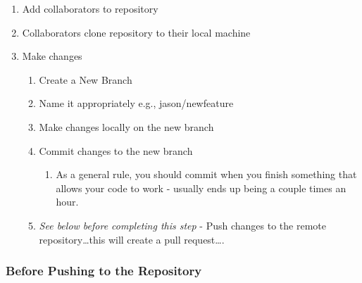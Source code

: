 \documentclass[
  letterpaper,
  DIV=11,
  numbers=noendperiod]{scrreprt}
\providecommand{\tightlist}{%
  \setlength{\itemsep}{0pt}\setlength{\parskip}{0pt}}\usepackage{longtable,booktabs,array}
\begin{document}
\begin{enumerate}
\def\labelenumi{\arabic{enumi}.}
\tightlist
\item
  Add collaborators to repository\\
\item
  Collaborators clone repository to their local machine\\
\item
  Make changes

  \begin{enumerate}
  \def\labelenumii{\alph{enumii}.}
  \tightlist
  \item
    Create a New Branch\\
  \item
    Name it appropriately e.g., jason/newfeature\\
  \item
    Make changes locally on the new branch\\
  \item
    Commit changes to the new branch

    \begin{enumerate}
    \def\labelenumiii{\roman{enumiii}.}
    \tightlist
    \item
      As a general rule, you should commit when you finish something
      that allows your code to work - usually ends up being a couple
      times an hour.\\
    \end{enumerate}
  \item
    \emph{See below before completing this step} - Push changes to the
    remote repository\ldots this will create a pull request\ldots.
  \end{enumerate}
\end{enumerate}

\subsubsection{Before Pushing to the
Repository}\label{before-pushing-to-the-repository}
\end{document}
